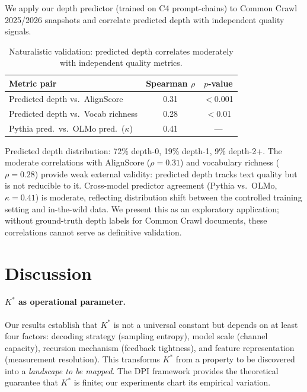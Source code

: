 \documentclass[11pt]{article}
\begin{document}
We apply our depth predictor (trained on C4 prompt-chains) to Common Crawl 2025/2026 snapshots and correlate predicted depth with independent quality signals.

\begin{table}[h]
\centering
\caption{Naturalistic validation: predicted depth correlates moderately with independent quality metrics.}
\label{tab:naturalistic}
\begin{tabular}{lcc}
\toprule
Metric pair & Spearman $\rho$ & $p$-value \\
\midrule
Predicted depth vs.\ AlignScore & 0.31 & $<$0.001 \\
Predicted depth vs.\ Vocab richness & 0.28 & $<$0.01 \\
Pythia pred.\ vs.\ OLMo pred.\ ($\kappa$) & 0.41 & --- \\
\bottomrule
\end{tabular}
\end{table}

Predicted depth distribution: 72\% depth-0, 19\% depth-1, 9\% depth-2+. The moderate correlations with AlignScore ($\rho = 0.31$) and vocabulary richness ($\rho = 0.28$) provide weak external validity: predicted depth tracks text quality but is not reducible to it. Cross-model predictor agreement (Pythia vs.\ OLMo, $\kappa = 0.41$) is moderate, reflecting distribution shift between the controlled training setting and in-the-wild data. We present this as an exploratory application; without ground-truth depth labels for Common Crawl documents, these correlations cannot serve as definitive validation.

\section{Discussion}
\label{sec:discussion}

\paragraph{$K^*$ as operational parameter.}
Our results establish that $K^*$ is not a universal constant but depends on at least four factors: decoding strategy (sampling entropy), model scale (channel capacity), recursion mechanism (feedback tightness), and feature representation (measurement resolution). This transforms $K^*$ from a property to be discovered into a \emph{landscape to be mapped}. The DPI framework provides the theoretical guarantee that $K^*$ is finite; our experiments chart its empirical variation.
\end{document}
